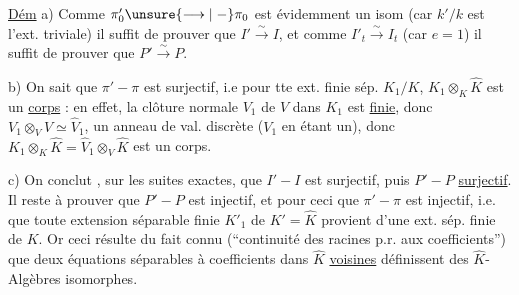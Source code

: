 \uline{Dém} a) Comme \(\pi'_0\unsure{\longrightarrow|\mathrel{-}}\pi_0\) est évidemment un isom (car \(k'/k\) est l'ext. triviale) il suffit de prouver que \(I'\xrightarrow{\sim}I\), et comme \(I'_t\xrightarrow{\sim}I_t\) (car \(e=1\)) il suffit de prouver que \(P'\xrightarrow{\sim}P\).

b) On sait que \(\pi'\mathrel{-}\pi\) est surjectif, i.e pour tte ext. finie sép. \(K_1/K\), \(K_1\otimes_K\widehat K\) est un \uline{corps} : en effet, la clôture normale \(V_1\) de \(V\) dans \(K_1\) est \uline{finie}, donc \(V_1\otimes_V\widehat V\simeq\widehat V_1\),   un anneau de val. discrète (\(V_1\) en étant un), donc \(K_1\otimes_K\widehat K=\widehat V_1\otimes_V\widehat K\) est un corps.


c) On  conclut , sur les  suites exactes, que \(I'\mathrel{-}I\) est surjectif, puis \(P'\mathrel{-}P\) \uline{surjectif}. Il reste à prouver que \(P'\mathrel{-}P\) est injectif, et pour ceci que \(\pi'\mathrel{-}\pi\) est injectif,  i.e. que toute extension séparable finie \(K'_1\) de \(K'=\widehat K\) provient d'une ext. sép. finie de \(K\). Or ceci résulte du fait connu (``continuité des racines p.r. aux coefficients'') que deux équations séparables  à coefficients dans \(\widehat K\) \uline{voisines} définissent des  \(\widehat K\)-Algèbres isomorphes.

